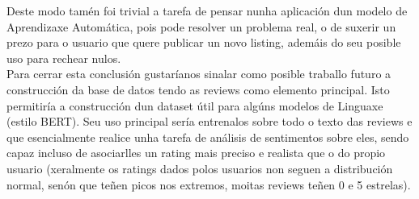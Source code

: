 \documentclass[12pt,a4paper]{article}
\begin{document}
Deste modo tamén foi trivial a tarefa de pensar nunha aplicación dun modelo de
Aprendizaxe Automática, pois pode resolver un problema real, o de suxerir un
prezo para o usuario que quere publicar un novo listing, ademáis do seu posible
uso para rechear nulos. \\

Para cerrar esta conclusión gustaríanos sinalar como posible traballo futuro a
construcción da base de datos tendo as reviews como elemento principal. Isto
permitiría a construcción dun dataset útil para algúns modelos de Linguaxe
(estilo BERT). Seu uso principal sería entrenalos sobre todo o texto das reviews
e que esencialmente realice unha tarefa de análisis de sentimentos sobre eles,
sendo capaz incluso de asociarlles un rating mais preciso e realista que o do
propio usuario (xeralmente os ratings dados polos usuarios non seguen a
distribución normal, senón que teñen picos nos extremos, moitas reviews teñen 0
e 5 estrelas). 
\newpage



\end{document}
